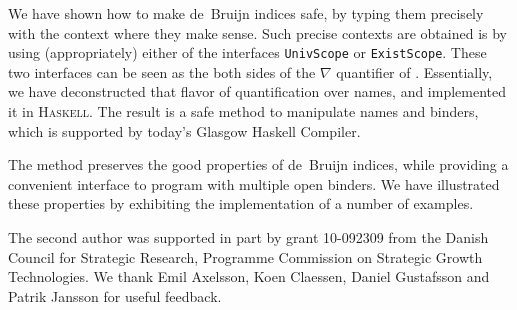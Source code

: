 \documentclass[9pt,authoryear]{sigplanconf}
\begin{document}
%
  We have shown how to make de{~}Bruijn indices safe, by typing them precisely with 
  the context where they make sense. Such precise contexts are obtained is by using (appropriately)
  either of the interfaces \texttt{UnivScope} or \texttt{ExistScope}. These two interfaces can 
  be seen as the both sides of the \ensuremath{\nabla} quantifier of \citet{miller_proof_2003}. 
  Essentially, we have deconstructed that flavor of quantification over names, 
  and implemented it in \textsc{Haskell}. The result is a safe method to manipulate names
  and binders, which is supported by today{'}s Glasgow Haskell Compiler.%


%
  The method preserves the good properties of de{~}Bruijn indices, while providing
  a convenient interface to program with multiple open binders. We have illustrated 
  these properties by exhibiting the implementation of a number of examples.


\acks{}The second author was supported in part by grant 10-092309 from
    the Danish Council for Strategic Research, Programme Commission
    on Strategic Growth Technologies. We thank Emil Axelsson, Koen
    Claessen, Daniel Gustafsson and Patrik Jansson for useful feedback.





\newpage
\end{document}
